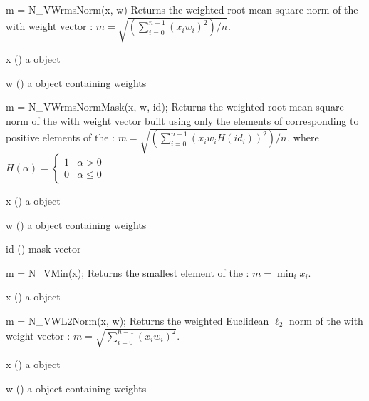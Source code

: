 {
  m = N\_VWrmsNorm(x, w)
}
{
  Returns the weighted root-mean-square norm of the   with
   weight vector :
  $m = \sqrt{\left( \sum_{i=0}^{n-1} (x_i w_i)^2 \right) / n}$.
}
{
  \begin{args}[x]
  \item[x] () a {\nvector} object
  \item[w] () a {\nvector} object containing weights
  \end{args}
}
{
}
{}

{
  m = N\_VWrmsNormMask(x, w, id);
}
{
  Returns the weighted root mean square norm of the   with
   weight vector  built using only
  the elements of  corresponding to
  positive elements of the  :
  $m = \sqrt{\left( \sum_{i=0}^{n-1} (x_i w_i H(id_i))^2 \right) / n}$,
  where
  $
  H(\alpha) =
  \begin{cases}
  1 & \alpha > 0 \\
  0 & \alpha \leq 0
  \end{cases}
  $
}
{
  \begin{args}[x]
  \item[x] () a {\nvector} object
  \item[w] () a {\nvector} object containing weights
  \item[id] () mask vector
  \end{args}
}
{
}
{}

{
  m = N\_VMin(x);
}
{
  Returns the smallest element of the  :
  $m = \min_i x_i $.
}
{
  \begin{args}[x]
  \item[x] () a {\nvector} object
  \end{args}
}
{
}
{}

{
  m = N\_VWL2Norm(x, w);
}
{
  Returns the weighted Euclidean $\ell_2$ norm of the  
  with  weight vector :
  $m = \sqrt{\sum_{i=0}^{n-1} (x_i w_i)^2}$.
}
{
  \begin{args}[x]
  \item[x] () a {\nvector} object
  \item[w] () a {\nvector} object containing weights
  \end{args}
}
{
}
{}

